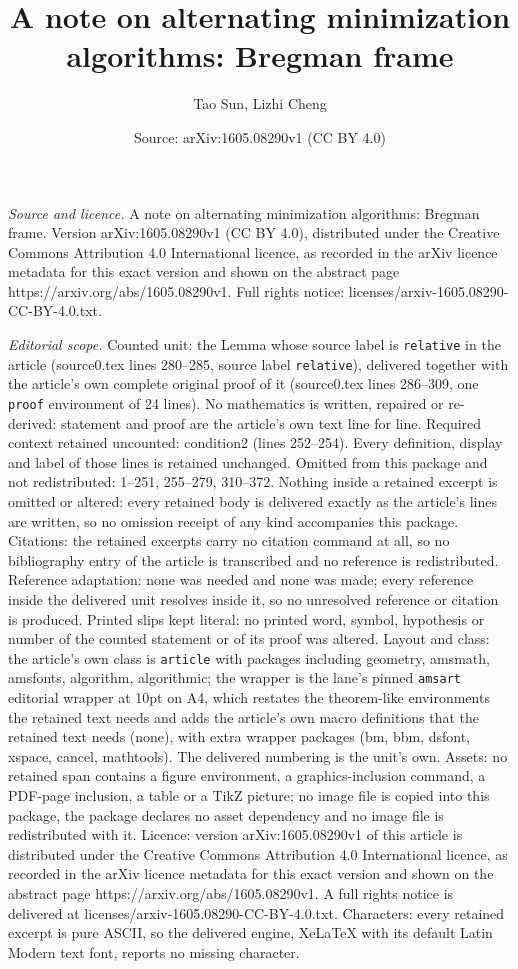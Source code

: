 \documentclass[10pt,a4paper]{amsart}
\title[A note on alternating minimization algorithms: Bregman frame]{A note on alternating minimization algorithms: Bregman frame}
\author{Tao Sun, Lizhi Cheng}
\date{Source: arXiv:1605.08290v1 (CC BY 4.0)}
\begin{document}
\maketitle

\noindent\emph{Source and licence.} A note on alternating minimization algorithms: Bregman frame. Version arXiv:1605.08290v1 (CC BY 4.0), distributed under the Creative Commons Attribution 4.0 International licence, as recorded in the arXiv licence metadata for this exact version and shown on the abstract page https://arxiv.org/abs/1605.08290v1. Full rights notice: licenses/arxiv-1605.08290-CC-BY-4.0.txt.\par\smallskip

\noindent\textit{Editorial scope.} Counted unit: the Lemma whose source label is \texttt{relative} in the article (source0.tex lines 280--285, source label \texttt{relative}), delivered together with the article's own complete original proof of it (source0.tex lines 286--309, one \texttt{proof} environment of 24 lines). No mathematics is written, repaired or re-derived: statement and proof are the article's own text line for line. Required context retained uncounted: condition2 (lines 252--254). Every definition, display and label of those lines is retained unchanged. Omitted from this package and not redistributed: 1--251, 255--279, 310--372. Nothing inside a retained excerpt is omitted or altered: every retained body is delivered exactly as the article's lines are written, so no omission receipt of any kind accompanies this package. Citations: the retained excerpts carry no citation command at all, so no bibliography entry of the article is transcribed and no reference is redistributed. Reference adaptation: none was needed and none was made; every reference inside the delivered unit resolves inside it, so no unresolved reference or citation is produced. Printed slips kept literal: no printed word, symbol, hypothesis or number of the counted statement or of its proof was altered. Layout and class: the article's own class is \texttt{article} with packages including geometry, amsmath, amsfonts, algorithm, algorithmic; the wrapper is the lane's pinned \texttt{amsart} editorial wrapper at 10pt on A4, which restates the theorem-like environments the retained text needs and adds the article's own macro definitions that the retained text needs (none), with extra wrapper packages (bm, bbm, dsfont, xspace, cancel, mathtools). The delivered numbering is the unit's own. Assets: no retained span contains a figure environment, a graphics-inclusion command, a PDF-page inclusion, a table or a TikZ picture; no image file is copied into this package, the package declares no asset dependency and no image file is redistributed with it. Licence: version arXiv:1605.08290v1 of this article is distributed under the Creative Commons Attribution 4.0 International licence, as recorded in the arXiv licence metadata for this exact version and shown on the abstract page https://arxiv.org/abs/1605.08290v1. A full rights notice is delivered at licenses/arxiv-1605.08290-CC-BY-4.0.txt. Characters: every retained excerpt is pure ASCII, so the delivered engine, XeLaTeX with its default Latin Modern text font, reports no missing character.
\end{document}
